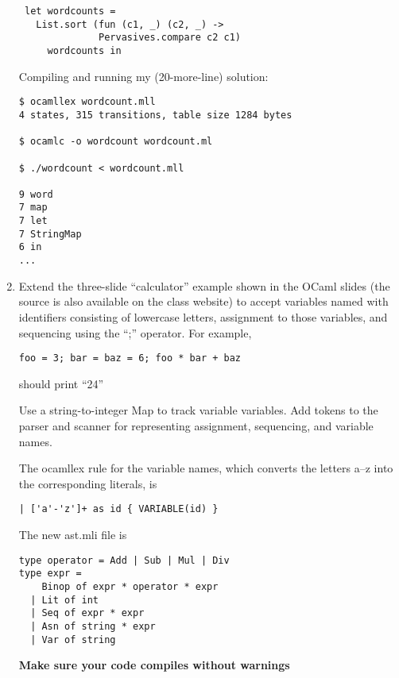 \documentclass[twocolumn]{article}
\begin{document}
\begin{enumerate}
\begin{lstlisting}
 let wordcounts =
   List.sort (fun (c1, _) (c2, _) ->
              Pervasives.compare c2 c1)
     wordcounts in
\end{lstlisting}

Compiling and running my (20-more-line) solution:

\begin{verbatim}
$ ocamllex wordcount.mll
4 states, 315 transitions, table size 1284 bytes

$ ocamlc -o wordcount wordcount.ml

$ ./wordcount < wordcount.mll

9 word
7 map
7 let
7 StringMap
6 in
...
\end{verbatim}

\item Extend the three-slide ``calculator'' example shown in the OCaml
  slides (the source is also available on the class website) to accept
  variables named with identifiers consisting of lowercase letters,
  assignment to those variables, and sequencing using the ``;''
  operator.  For example,

\begin{verbatim}
foo = 3; bar = baz = 6; foo * bar + baz
\end{verbatim}

should print ``24''

Use a string-to-integer Map to track variable variables.  Add tokens
to the parser and scanner for representing assignment, sequencing, and
variable names.

The ocamllex rule for the variable names, which converts the letters a--z
into the corresponding literals, is

\begin{lstlisting}
| ['a'-'z']+ as id { VARIABLE(id) }
\end{lstlisting}

The new ast.mli file is

\begin{lstlisting}
type operator = Add | Sub | Mul | Div
type expr =
    Binop of expr * operator * expr
  | Lit of int
  | Seq of expr * expr
  | Asn of string * expr
  | Var of string
\end{lstlisting}

\textbf{Make sure your code compiles without warnings}

\end{enumerate}

\thispagestyle{empty}
\end{document}
